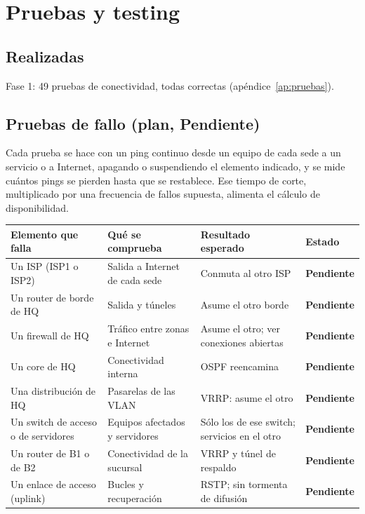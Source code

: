 \documentclass[11pt,a4paper]{article}
\newcommand{\pen}{\textcolor{rojo}{\textbf{Pendiente}}}
\begin{document}
\section{Pruebas y testing}\label{sec:pruebas}
\subsection{Realizadas}
Fase 1: 49 pruebas de conectividad, todas correctas (apéndice~\ref{ap:pruebas}).

\subsection{Pruebas de fallo (plan, \pen)}
Cada prueba se hace con un ping continuo desde un equipo de cada sede a un servicio o a Internet, apagando o suspendiendo el elemento indicado, y se mide cuántos pings se pierden hasta que se restablece. Ese tiempo de corte, multiplicado por una frecuencia de fallos supuesta, alimenta el cálculo de disponibilidad.
\begingroup\footnotesize
\begin{longtable}{@{}p{4.1cm}p{5.5cm}p{4.2cm}p{2.7cm}@{}}
\toprule
\textbf{Elemento que falla} & \textbf{Qué se comprueba} & \textbf{Resultado esperado} & \textbf{Estado}\\
\midrule
\endhead
Un ISP (ISP1 o ISP2) & Salida a Internet de cada sede & Conmuta al otro ISP & \pen\\
Un router de borde de HQ & Salida y túneles & Asume el otro borde & \pen\\
Un firewall de HQ & Tráfico entre zonas e Internet & Asume el otro; ver conexiones abiertas & \pen\\
Un core de HQ & Conectividad interna & OSPF reencamina & \pen\\
Una distribución de HQ & Pasarelas de las VLAN & VRRP: asume el otro & \pen\\
Un switch de acceso o de servidores & Equipos afectados y servidores & Sólo los de ese switch; servicios en el otro & \pen\\
Un router de B1 o de B2 & Conectividad de la sucursal & VRRP y túnel de respaldo & \pen\\
Un enlace de acceso (uplink) & Bucles y recuperación & RSTP; sin tormenta de difusión & \pen\\
\bottomrule
\end{longtable}
\endgroup
\end{document}
